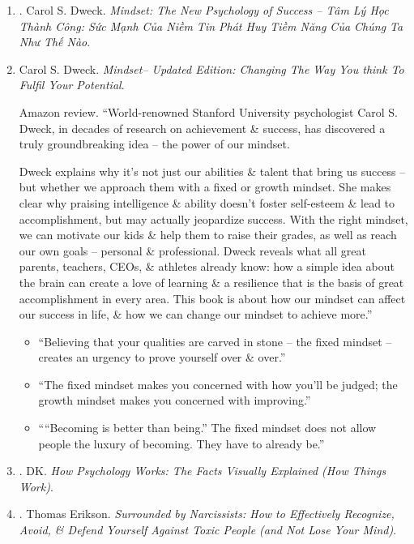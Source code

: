 \documentclass{article}
\begin{document}
\begin{enumerate}
	\item \cite{Dweck_mindset_VN}. {\sc Carol S. Dweck}. {\it Mindset: The New Psychology of Success -- Tâm Lý Học Thành Công: Sức Mạnh Của Niềm Tin Phát Huy Tiềm Năng Của Chúng Ta Như Thế Nào}.\hfill{\sf[done]}
	
	\item {\sc Carol S. Dweck}. {\it Mindset-- Updated Edition: Changing The Way You think To Fulfil Your Potential}. {}
	
	{\sf Amazon review.} ``World-renowned Stanford University psychologist {\sc Carol S. Dweck}, in decades of research on achievement \& success, has discovered a truly groundbreaking idea -- the power of our mindset.
	
	{\sc Dweck} explains why it's not just our abilities \& talent that bring us success -- but whether we approach them with a fixed or growth mindset. She makes clear why praising intelligence \& ability doesn't foster self-esteem \& lead to accomplishment, but may actually jeopardize success. With the right mindset, we can motivate our kids \& help them to raise their grades, as well as reach our own goals -- personal \& professional. {\sc Dweck} reveals what all great parents, teachers, CEOs, \& athletes already know: how a simple idea about the brain can create a love of learning \& a resilience that is the basis of great accomplishment in every area. This book is about how our mindset can affect our success in life, \& how we can change our mindset to achieve more.''
	\begin{itemize}
		\item ``Believing that your qualities are carved in stone -- the fixed mindset -- creates an urgency to prove yourself over \& over.''
		\item ``The fixed mindset makes you concerned with how you'll be judged; the growth mindset makes you concerned with improving.''
		\item ````Becoming is better than being.'' The fixed mindset does not allow people the luxury of becoming. They have to already be.''
	\end{itemize}
	
	\item \cite{DK2018}. DK. {\it How Psychology Works: The Facts Visually Explained (How Things Work)}.\hfill{\sf[reading]}
	
	\item \cite{Erikson_narcisisst}. {\sc Thomas Erikson}. {\it Surrounded by Narcissists: How to Effectively Recognize, Avoid, \& Defend Yourself Against Toxic People (and Not Lose Your Mind)}. {}
	

\end{enumerate}
\end{document}
